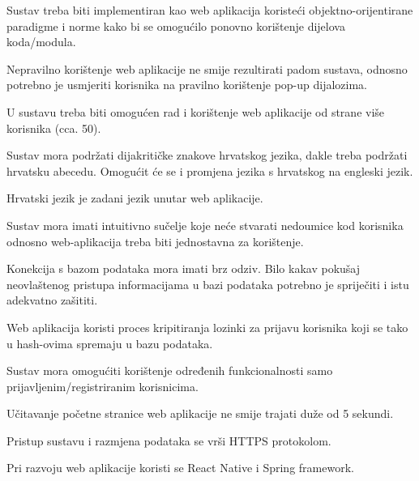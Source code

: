 \begin{packed_item}

	\item Sustav treba biti implementiran kao web aplikacija koristeći objektno-orijentirane paradigme i norme kako bi se omogućilo ponovno korištenje dijelova koda/modula.
	\item Nepravilno korištenje web aplikacije ne smije rezultirati padom sustava, odnosno potrebno je usmjeriti korisnika na pravilno korištenje pop-up dijalozima.
	\item U sustavu treba biti omogućen rad i korištenje web aplikacije od strane više korisnika (cca. 50).
	\item Sustav mora podržati dijakritičke znakove hrvatskog jezika, dakle treba podržati hrvatsku abecedu. Omogućit će se i promjena jezika s hrvatskog na engleski jezik.
	\item Hrvatski jezik je zadani jezik unutar web aplikacije.
	\item Sustav mora imati intuitivno sučelje koje neće stvarati nedoumice kod korisnika odnosno web-aplikacija treba biti jednostavna za korištenje.
	\item Konekcija s bazom podataka mora imati brz odziv. Bilo kakav pokušaj neovlaštenog pristupa informacijama u bazi podataka potrebno je spriječiti i istu adekvatno zašititi.
	\item Web aplikacija koristi proces kripitiranja lozinki za prijavu korisnika koji se tako u hash-ovima spremaju u bazu podataka.
	\item Sustav mora omogućiti korištenje određenih funkcionalnosti samo prijavljenim/registriranim korisnicima.
	\item Učitavanje početne stranice web aplikacije ne smije trajati duže od 5 sekundi.
	\item Pristup sustavu i razmjena podataka se vrši HTTPS protokolom.
	\item Pri razvoju web aplikacije koristi se React Native i Spring framework.

\end{packed_item}



